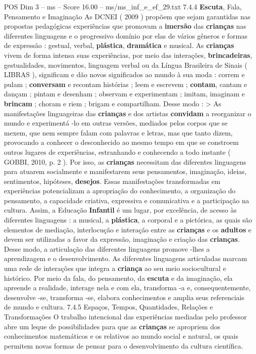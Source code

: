 \begin{textsample}{POS Dim 3 – ms – Score 16.00 – ms/ms\_inf\_e\_ef\_29.txt}  \label{ex:f3_pos_194}
7.4.4 \textbf{Escuta}, Fala, Pensamento e Imaginação As DCNEI ( 2009 ) propõem que sejam garantidas nas propostas pedagógicas experiências que promovam a \textbf{imersão} das \textbf{crianças} nas diferentes linguagens e o progressivo domínio por elas de vários gêneros e formas de expressão : gestual, verbal, \textbf{plástica}, \textbf{dramática} e musical.
As \textbf{crianças} vivem de forma intensa suas experiências, por meio das interações, \textbf{brincadeiras}, gestualidades, movimentos, linguagem verbal ou da Língua Brasileira de Sinais ( LIBRAS ), significam e dão novos significados ao mundo à sua moda : correm e pulam ; \textbf{conversam} e recontam histórias ; leem e escrevem ; \textbf{contam}, cantam e dançam ; pintam e desenham ; observam e experimentam ; imitam, imaginam e \textbf{brincam} ; choram e riem ; brigam e compartilham.
Desse modo : > As manifestações linguageiras das \textbf{crianças} e dos artistas \textbf{convidam} a reorganizar o mundo e experimentá -lo em outras versões, mediados pelos corpos que se mexem, que nem sempre falam com palavras e letras, mas que tanto dizem, provocando a conhecer o desconhecido ao mesmo tempo em que se constroem outros lugares de experiências, estranhando e conhecendo a todo instante ( GOBBI, 2010, p. 2 ).
Por isso, as \textbf{crianças} necessitam das diferentes linguagens para atuarem socialmente e manifestarem seus pensamentos, imaginação, ideias, sentimentos, hipóteses, \textbf{desejos}.
Essas manifestações transformadas em experiências potencializam a apropriação do conhecimento, a organização do pensamento, a capacidade criativa, expressiva e comunicativa e a participação na cultura.
Assim, a Educação \textbf{Infantil} é um lugar, por excelência, de acesso às diferentes linguagens : a musical, a \textbf{plástica}, a corporal e a pictórica, as quais são elementos de mediação, interlocução e interação entre as \textbf{crianças} e os \textbf{adultos} e devem ser utilizadas a favor da expressão, imaginação e criação das \textbf{crianças}.
Desse modo, a articulação das diferentes linguagens promove -lhes a aprendizagem e o desenvolvimento.
As diferentes linguagens articuladas marcam uma rede de interações que integra a \textbf{criança} ao seu meio sociocultural e histórico.
Por meio da fala, do pensamento, da \textbf{escuta} e da imaginação, ela apreende a realidade, interage nela e com ela, transforma -a e, consequentemente, desenvolve -se, transforma -se, elabora conhecimentos e amplia seus referenciais de mundo e cultura. 7.4.5 Espaços, Tempos, Quantidades, Relações e Transformações O trabalho intencional das experiências mediadas pelo professor abre um leque de possibilidades para que as \textbf{crianças} se apropriem dos conhecimentos matemáticos e os relativos ao mundo social e natural, os quais permitem novas formas de pensar para o desenvolvimento da cultura científica.

\end{textsample}
